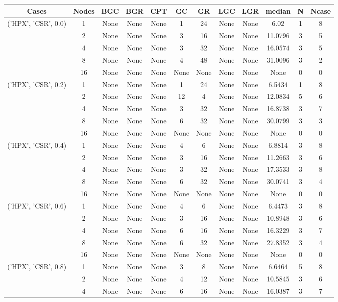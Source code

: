\begin{tabular}{cccccccccccc}
\hline
Cases & Nodes& BGC& BGR& CPT& GC& GR& LGC& LGR& median & N & Ncase \\
\hline
\multirow{5}{*}{('HPX', 'CSR', 0.0)}& 1& None& None& None& 1& 24& None& None& 6.02& 1& 8\\
& 2& None& None& None& 3& 16& None& None& 11.0796& 3& 5\\
& 4& None& None& None& 3& 32& None& None& 16.0574& 3& 5\\
& 8& None& None& None& 4& 48& None& None& 31.0096& 3& 2\\
& 16& None& None& None& None& None& None& None& None& 0& 0\\
\hline
\multirow{5}{*}{('HPX', 'CSR', 0.2)}& 1& None& None& None& 1& 24& None& None& 6.5434& 1& 8\\
& 2& None& None& None& 12& 4& None& None& 12.0834& 5& 6\\
& 4& None& None& None& 3& 32& None& None& 16.8738& 3& 7\\
& 8& None& None& None& 6& 32& None& None& 30.0799& 3& 3\\
& 16& None& None& None& None& None& None& None& None& 0& 0\\
\hline
\multirow{5}{*}{('HPX', 'CSR', 0.4)}& 1& None& None& None& 4& 6& None& None& 6.8814& 3& 8\\
& 2& None& None& None& 3& 16& None& None& 11.2663& 3& 6\\
& 4& None& None& None& 3& 32& None& None& 17.3533& 3& 8\\
& 8& None& None& None& 6& 32& None& None& 30.0741& 3& 4\\
& 16& None& None& None& None& None& None& None& None& 0& 0\\
\hline
\multirow{5}{*}{('HPX', 'CSR', 0.6)}& 1& None& None& None& 4& 6& None& None& 6.4473& 3& 8\\
& 2& None& None& None& 3& 16& None& None& 10.8948& 3& 6\\
& 4& None& None& None& 6& 16& None& None& 16.3229& 3& 7\\
& 8& None& None& None& 6& 32& None& None& 27.8352& 3& 4\\
& 16& None& None& None& None& None& None& None& None& 0& 0\\
\hline
\multirow{5}{*}{('HPX', 'CSR', 0.8)}& 1& None& None& None& 3& 8& None& None& 6.6464& 5& 8\\
& 2& None& None& None& 4& 12& None& None& 10.5845& 3& 6\\
& 4& None& None& None& 6& 16& None& None& 16.0387& 3& 7\\

\end{tabular}
